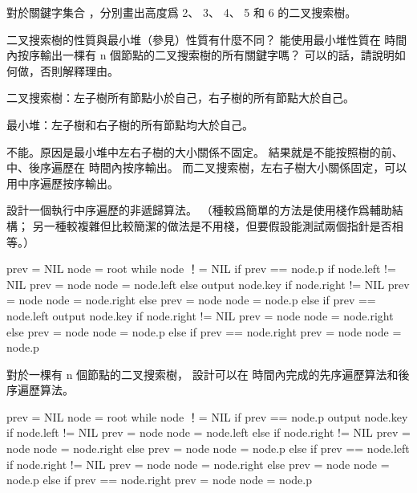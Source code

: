 \startsection[
  title={What is a binary search tree?},
]

\startEXERCISE
對於關鍵字集合 ，分別畫出高度爲 2、 3、 4、 5 和 6 的二叉搜索樹。
\stopEXERCISE

\startANSWER
\externalfigure[output/e12_1_1-1]
\externalfigure[output/e12_1_1-2]
\externalfigure[output/e12_1_1-3]
\externalfigure[output/e12_1_1-4]
\externalfigure[output/e12_1_1-5]
\stopANSWER

\startEXERCISE
二叉搜索樹的性質與最小堆（參見）性質有什麼不同？
能使用最小堆性質在  時間內按序輸出一棵有 n 個節點的二叉搜索樹的所有關鍵字嗎？
可以的話，請說明如何做，否則解釋理由。
\stopEXERCISE

\startANSWER
二叉搜索樹：左子樹所有節點小於自己，右子樹的所有節點大於自己。

最小堆：左子樹和右子樹的所有節點均大於自己。

不能。原因是最小堆中左右子樹的大小關係不固定。
結果就是不能按照樹的前、中、後序遍歷在  時間內按序輸出。
而二叉搜索樹，左右子樹大小關係固定，可以用中序遍歷按序輸出。
\stopANSWER

\startEXERCISE
設計一個執行中序遍歷的非遞歸算法。
（\hint 種較爲簡單的方法是使用棧作爲輔助結構；
另一種較複雜但比較簡潔的做法是不用棧，但要假設能測試兩個指針是否相等。）
\stopEXERCISE

\startANSWER
{}
\startCLRS
prev = NIL
node = root
while node ！= NIL
	if prev == node.p
		if node.left != NIL
			prev = node
			node = node.left
		else
			output node.key
			if node.right != NIL
				prev = node
				node = node.right
			else
				prev = node
				node = node.p
	else if prev == node.left
		output node.key
		if node.right != NIL
			prev = node
			node = node.right
		else
			prev = node
			node = node.p
	else if prev == node.right
		prev = node
		node = node.p
\stopCLRS
\stopANSWER

\startEXERCISE
對於一棵有 n 個節點的二叉搜索樹，
設計可以在  時間內完成的先序遍歷算法和後序遍歷算法。
\stopEXERCISE

\startANSWER
{}
\startCLRS
prev = NIL
node = root
while node ！= NIL
	if prev == node.p
		output node.key
		if node.left != NIL
			prev = node
			node = node.left
		else
			if node.right != NIL
				prev = node
				node = node.right
			else
				prev = node
				node = node.p
	else if prev == node.left
		if node.right != NIL
			prev = node
			node = node.right
		else
			prev = node
			node = node.p
	else if prev == node.right
		prev = node
		node = node.p
\stopCLRS


